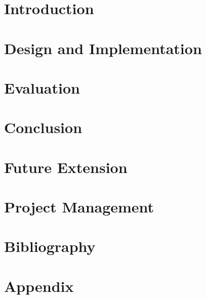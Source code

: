 \documentclass[pdftex,11pt,a4paper]{article}
\begin{document}


\renewcommand{\abstractname}{Executive Summary}
\begin{abstract}

\end{abstract}
\tableofcontents
\section{Introduction}

\section{Design and Implementation}

\section{Evaluation}

\section{Conclusion}

\section{Future Extension}

\section{Project Management}

\section{Bibliography}
\section{Appendix}
\end{document}
